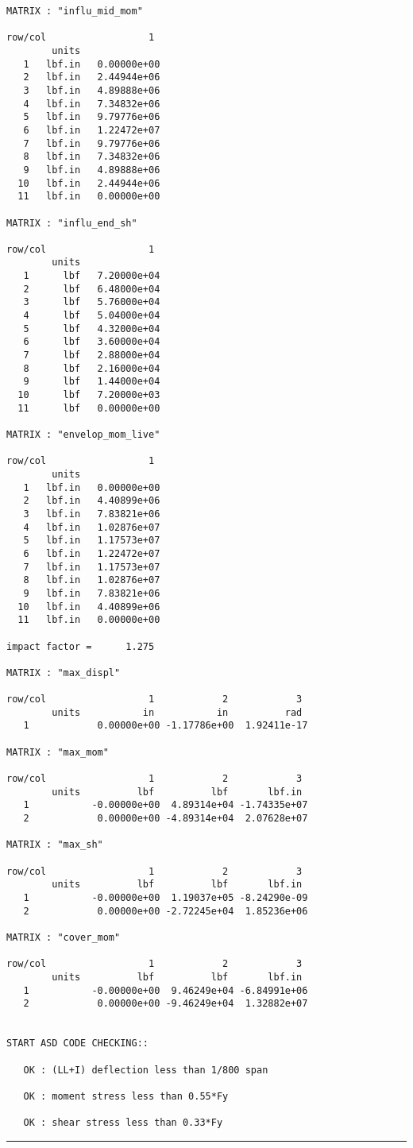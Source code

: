 \begin{footnotesize}
\begin{verbatim}
MATRIX : "influ_mid_mom"

row/col                  1   
        units                
   1   lbf.in   0.00000e+00
   2   lbf.in   2.44944e+06
   3   lbf.in   4.89888e+06
   4   lbf.in   7.34832e+06
   5   lbf.in   9.79776e+06
   6   lbf.in   1.22472e+07
   7   lbf.in   9.79776e+06
   8   lbf.in   7.34832e+06
   9   lbf.in   4.89888e+06
  10   lbf.in   2.44944e+06
  11   lbf.in   0.00000e+00

MATRIX : "influ_end_sh"

row/col                  1   
        units                
   1      lbf   7.20000e+04
   2      lbf   6.48000e+04
   3      lbf   5.76000e+04
   4      lbf   5.04000e+04
   5      lbf   4.32000e+04
   6      lbf   3.60000e+04
   7      lbf   2.88000e+04
   8      lbf   2.16000e+04
   9      lbf   1.44000e+04
  10      lbf   7.20000e+03
  11      lbf   0.00000e+00

MATRIX : "envelop_mom_live"

row/col                  1   
        units                
   1   lbf.in   0.00000e+00
   2   lbf.in   4.40899e+06
   3   lbf.in   7.83821e+06
   4   lbf.in   1.02876e+07
   5   lbf.in   1.17573e+07
   6   lbf.in   1.22472e+07
   7   lbf.in   1.17573e+07
   8   lbf.in   1.02876e+07
   9   lbf.in   7.83821e+06
  10   lbf.in   4.40899e+06
  11   lbf.in   0.00000e+00

impact factor =      1.275 

MATRIX : "max_displ"

row/col                  1            2            3   
        units           in           in          rad   
   1            0.00000e+00 -1.17786e+00  1.92411e-17

MATRIX : "max_mom"

row/col                  1            2            3   
        units          lbf          lbf       lbf.in   
   1           -0.00000e+00  4.89314e+04 -1.74335e+07
   2            0.00000e+00 -4.89314e+04  2.07628e+07

MATRIX : "max_sh"

row/col                  1            2            3   
        units          lbf          lbf       lbf.in   
   1           -0.00000e+00  1.19037e+05 -8.24290e-09
   2            0.00000e+00 -2.72245e+04  1.85236e+06

MATRIX : "cover_mom"

row/col                  1            2            3   
        units          lbf          lbf       lbf.in   
   1           -0.00000e+00  9.46249e+04 -6.84991e+06
   2            0.00000e+00 -9.46249e+04  1.32882e+07


START ASD CODE CHECKING::

   OK : (LL+I) deflection less than 1/800 span

   OK : moment stress less than 0.55*Fy
 
   OK : shear stress less than 0.33*Fy
\end{verbatim}
\rule{6.25 in}{0.035 in}
\end{footnotesize}

